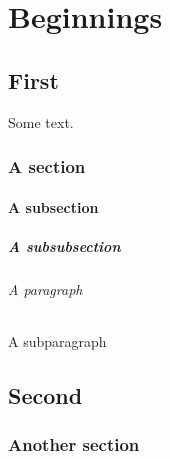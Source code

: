 \documentclass{report}
\begin{document}
\tableofcontents
\part{Beginnings}
\chapter{First}
Some text.
\section{A section}
\lipsum[1]
\subsection{A subsection}
\lipsum[1]
\subsubsection{A subsubsection}
\lipsum[1]
\paragraph{A paragraph}
\lipsum[1]
\subparagraph{A subparagraph}
\lipsum[1]
\chapter{Second}
\section{Another section}
\lipsum[2]
\end{document}
